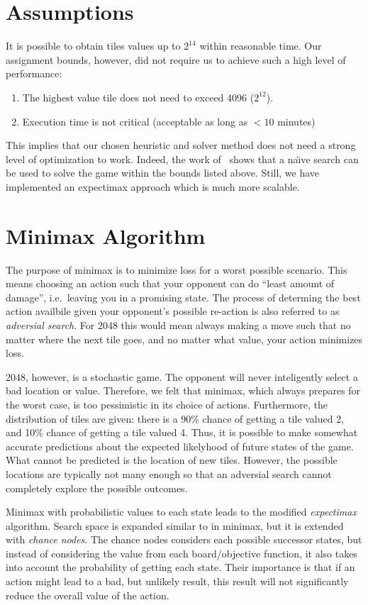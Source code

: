 \documentclass[journal]{IEEEtran}
\def\naive{na\"{\i}ve}
\begin{document}
\section*{Assumptions}
It is possible to obtain tiles values up to $2^{14}$ within reasonable time.
Our assignment bounds, however, did not require us to achieve such a high level
of performance:
\begin{enumerate}
    \item The highest value tile does not need to exceed 4096 ($2^{12}$).
    \item Execution time is not critical (acceptable as long as $< 10$ minutes)
\end{enumerate}
This implies that our chosen heuristic and solver method does not need a strong
level of optimization to work. Indeed, the work of~\cite{brutesolver} shows that
a \naive{} search can be used to solve the game within the bounds listed above.
Still, we have implemented an expectimax approach which is much more scalable.

\section*{Minimax Algorithm}
The purpose of minimax is to minimize loss for a worst possible scenario.
This means choosing an action such that your opponent can do ``least amount of damage'',
i.e.\ leaving you in a promising state. The process of determing the best
action availbile given your opponent's possible re-action is also referred to as 
\textit{adversial search}.
For 2048 this would mean always making a move such that no matter where the next
tile goes, and no matter what value, your action minimizes loss.


2048, however, is a stochastic game. The opponent will never inteligently
select a bad location or value. Therefore, we felt that minimax, which always prepares
for the worst case, is too pessimistic in its choice of actions. Furthermore, the
distribution of tiles are given: there is a 90\% chance of getting a
tile valued 2, and 10\% chance of getting a tile valued 4. Thus, it is possible
to make somewhat accurate predictions about the expected likelyhood of future states of the
game. What cannot be predicted is the location of new tiles. However, the possible
locations are typically not many enough so that an adversial search cannot completely
explore the possible outcomes.


Minimax with probabilistic values to each state leads to the modified \textit{expectimax} algorithm.
Search space is expanded similar to in minimax, but it is extended with 
\textit{chance nodes}.  The chance nodes considers each possible successor states, but instead
of considering the value from each board/objective function, it also takes into account 
the probability of getting each state.
Their importance is that if an action might lead to a bad, but unlikely result,
this result will not significantly reduce the overall value of the action.
\end{document}
